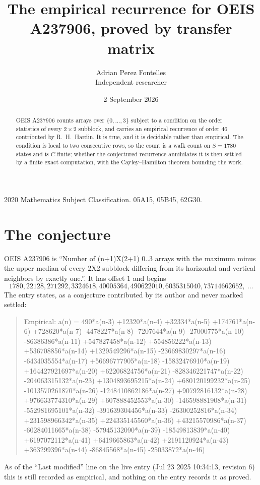 \documentclass[11pt,a4paper]{article}
\title{The empirical recurrence for OEIS A237906, proved by transfer matrix}
\author{Adrian Perez Fontelles\\ \small Independent researcher}
\date{2 September 2026}
\theoremstyle{plain}
\theoremstyle{definition}
\begin{document}
\maketitle

\begin{abstract}
OEIS A237906 counts arrays over $\{0,\dots,3\}$ subject to a condition on the order
statistics of every $2\times2$ subblock, and carries an empirical recurrence of order
$46$ contributed by R.~H.~Hardin. It is true, and it is decidable rather than empirical.
The condition is local to two consecutive rows, so the count is a walk count on $S=1780$
states and is $C$-finite; whether the conjectured recurrence annihilates it is then settled by
a finite exact computation, with the Cayley--Hamilton theorem bounding the work.
\end{abstract}

\noindent\small 2020 Mathematics Subject Classification. 05A15, 05B45, 62G30.\normalsize

\section{The conjecture}

OEIS A237906 is ``Number of (n+1)X(2+1) 0..3 arrays with the maximum minus the upper median of every 2X2 subblock differing from its horizontal and vertical neighbors by exactly one.''. It has offset $1$ and begins
\[
1780, 22128, 271292, 3324618, 40005364, 490622010, 6035315040, 73714662652,\ \dots
\]
The entry states, as a conjecture contributed by its author and never marked settled:
\begin{quote}
Empirical: a(n) = 490*a(n-3) +12320*a(n-4) +32334*a(n-5) +174761*a(n-6) +728620*a(n-7) -4478227*a(n-8) -7207644*a(n-9) -27000775*a(n-10) -86386386*a(n-11) +547827458*a(n-12) +554856222*a(n-13) +536708856*a(n-14) +1329549296*a(n-15) -23669830297*a(n-16) -6434035554*a(n-17) +56696777905*a(n-18) -15832476910*a(n-19) +164427921697*a(n-20) +62206824756*a(n-21) -828346221747*a(n-22) -204063315132*a(n-23) +1304893695215*a(n-24) +680120199232*a(n-25) -1013570261870*a(n-26) -1248410862186*a(n-27) +90792816132*a(n-28) +976633774310*a(n-29) +607888452553*a(n-30) -146598881908*a(n-31) -552981695101*a(n-32) -391639304456*a(n-33) -26300252816*a(n-34) +231598966342*a(n-35) +224335145560*a(n-36) +43215570986*a(n-37) -60284011665*a(n-38) -57945132090*a(n-39) -18549813839*a(n-40) +6197072112*a(n-41) +6419665863*a(n-42) +2191120924*a(n-43) +363299396*a(n-44) -86845568*a(n-45) -25033872*a(n-46)
\end{quote}
As of the ``Last modified'' line on the live entry (Jul 23 2025 10:34:13, revision 6) this is still
recorded as empirical, and nothing on the entry records it as proved.
\end{document}
